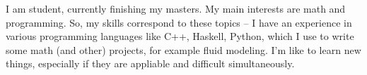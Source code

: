 \documentclass[9pt]{developercv} %
\begin{document}
\vspace{0.5cm}



\begin{minipage}[t]{0.6\textwidth} %
	\vspace{-\baselineskip} %
	I am student, currently finishing my masters. My main interests are math and programming. So, my skills correspond to these topics -- I have an experience in various programming languages like C++, Haskell, Python, which I use to write some math (and other) projects, for example fluid modeling. I'm like to learn new things, especially if they are appliable and difficult simultaneously.
	
	
\end{minipage}
\hfill %
\begin{minipage}[t]{0.5\textwidth} %
	\vspace{-\baselineskip} %

\end{minipage}



\end{document}
